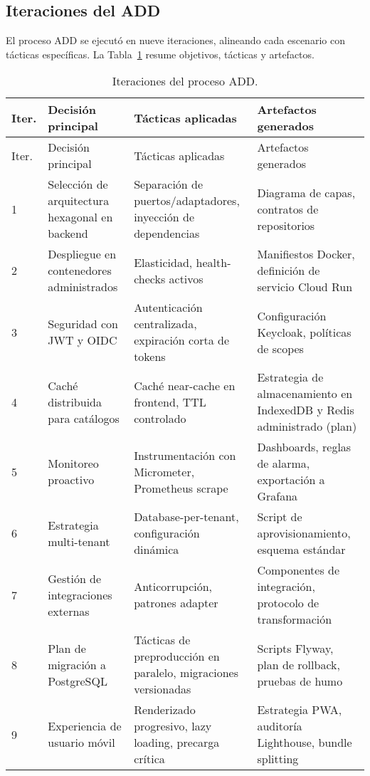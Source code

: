 \documentclass[12pt,letterpaper]{article}
\begin{document}
\subsection{Iteraciones del ADD}
El proceso ADD se ejecutó en nueve iteraciones, alineando cada escenario con tácticas específicas. La Tabla~\ref{tab:add-iteraciones} resume objetivos, tácticas y artefactos.

\begin{longtable}{p{0.7cm} p{4.2cm} p{5.3cm} p{5.3cm}}
  \caption{Iteraciones del proceso ADD.}\label{tab:add-iteraciones}\\
  \toprule
  Iter. & Decisión principal & Tácticas aplicadas & Artefactos generados \\
  \midrule
  \endfirsthead
  \toprule
  Iter. & Decisión principal & Tácticas aplicadas & Artefactos generados \\
  \midrule
  \endhead
  1 & Selección de arquitectura hexagonal en backend & Separación de puertos/adaptadores, inyección de dependencias & Diagrama de capas, contratos de repositorios \\
  2 & Despliegue en contenedores administrados & Elasticidad, health-checks activos & Manifiestos Docker, definición de servicio Cloud Run \\
  3 & Seguridad con JWT y OIDC & Autenticación centralizada, expiración corta de tokens & Configuración Keycloak, políticas de scopes \\
  4 & Caché distribuida para catálogos & Caché near-cache en frontend, TTL controlado & Estrategia de almacenamiento en IndexedDB y Redis administrado (plan) \\
  5 & Monitoreo proactivo & Instrumentación con Micrometer, Prometheus scrape & Dashboards, reglas de alarma, exportación a Grafana \\
  6 & Estrategia multi-tenant & Database-per-tenant, configuración dinámica & Script de aprovisionamiento, esquema estándar \\
  7 & Gestión de integraciones externas & Anticorrupción, patrones adapter & Componentes de integración, protocolo de transformación \\
  8 & Plan de migración a PostgreSQL & Tácticas de preproducción en paralelo, migraciones versionadas & Scripts Flyway, plan de rollback, pruebas de humo \\
  9 & Experiencia de usuario móvil & Renderizado progresivo, lazy loading, precarga crítica & Estrategia PWA, auditoría Lighthouse, bundle splitting \\
  \bottomrule
\end{longtable}
\end{document}
